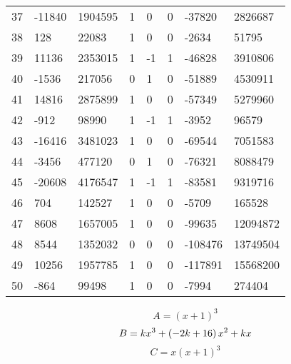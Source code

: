 \documentclass{amsart}
\begin{document}
\begin{longtable}{|l|l|l|lllll|}
37&-11840&1904595&1&0&0&-37820&2826687\\
38&128&22083&1&0&0&-2634&51795\\
39&11136&2353015&1&-1&1&-46828&3910806\\
40&-1536&217056&0&1&0&-51889&4530911\\
41&14816&2875899&1&0&0&-57349&5279960\\
42&-912&98990&1&-1&1&-3952&96579\\
43&-16416&3481023&1&0&0&-69544&7051583\\
44&-3456&477120&0&1&0&-76321&8088479\\
45&-20608&4176547&1&-1&1&-83581&9319716\\
46&704&142527&1&0&0&-5709&165528\\
47&8608&1657005&1&0&0&-99635&12094872\\
48&8544&1352032&0&0&0&-108476&13749504\\
49&10256&1957785&1&0&0&-117891&15568200\\
50&-864&99498&1&0&0&-7994&274404\\
\hline
\end{longtable}
$$A=(x
 + 1)^{3}$$
$$B=k\*x^3
 + \left(-2\*k
 + 16\right) \*x^2
 + k\*x$$
$$C=x(x
 + 1)^{3}$$
\end{document}
